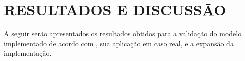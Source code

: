 
\chapter{\normalsize{RESULTADOS E DISCUSSÃO}} \label{cap:resultados e discussao}

A seguir serão apresentados os resultados obtidos para a validação do modelo implementado de acordo com , sua aplicação em caso real, e a expansão da implementação.










